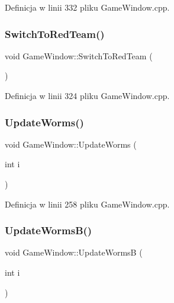 Definicja w linii 332 pliku Game\+Window.\+cpp.

\mbox{\label{class_game_window_a735db6bd1918401c3b36502d14c8fd7b}} 
\subsubsection{\texorpdfstring{Switch\+To\+Red\+Team()}{SwitchToRedTeam()}}
{\footnotesize\ttfamily void Game\+Window\+::\+Switch\+To\+Red\+Team (\begin{DoxyParamCaption}{ }\end{DoxyParamCaption})}



Definicja w linii 324 pliku Game\+Window.\+cpp.

\mbox{\label{class_game_window_a043804fa483c8ea2f348b6fb1dac4e4a}} 
\subsubsection{\texorpdfstring{Update\+Worms()}{UpdateWorms()}}
{\footnotesize\ttfamily void Game\+Window\+::\+Update\+Worms (\begin{DoxyParamCaption}\item[{int}]{i }\end{DoxyParamCaption})}



Definicja w linii 258 pliku Game\+Window.\+cpp.

\mbox{\label{class_game_window_aa6659ccbd2a5d27141eb3f00fdc72ea6}} 
\subsubsection{\texorpdfstring{Update\+Worms\+B()}{UpdateWormsB()}}
{\footnotesize\ttfamily void Game\+Window\+::\+Update\+WormsB (\begin{DoxyParamCaption}\item[{int}]{i }\end{DoxyParamCaption})}



